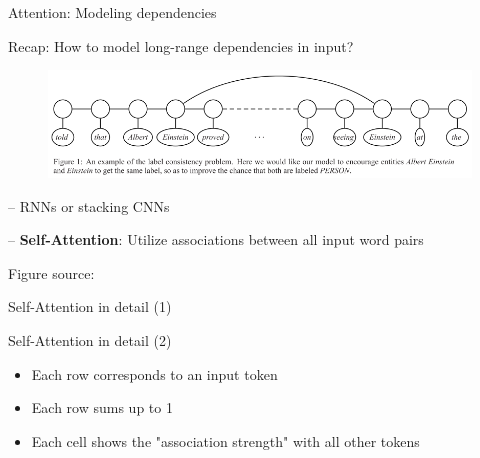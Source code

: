\documentclass[12pt,aspectratio=169,handout]{beamer}
\begin{document}
\begin{frame}{Attention: Modeling dependencies}
	
	Recap: How to model long-range dependencies in input?
	
	\begin{figure}
		\includegraphics[width=0.95\linewidth]{img/long-deps.png}
	\end{figure}
	
	
	-- RNNs or stacking CNNs
	
	-- \textbf{Self-Attention}: Utilize associations between all input word pairs
	
	\begin{scriptsize}
		Figure source: 
	\end{scriptsize}
	
\end{frame}



\begin{frame}{Self-Attention in detail (1)}
	
	
	\begin{figure}
		\scalebox{0.75}{\hspace{-2cm}
			
		}
	\end{figure}
	
\end{frame}

\begin{frame}{Self-Attention in detail (2)}
	
	
	\begin{figure}
		\scalebox{0.75}{\hspace{-2cm}
			
		}
	\end{figure}
	
	\begin{itemize}
		\item 	Each row corresponds to an input token
		
		\item Each row sums up to 1
		
		\item Each cell shows the "association strength" with all other tokens
		
	\end{itemize}
	
	
\end{frame}
\end{document}
